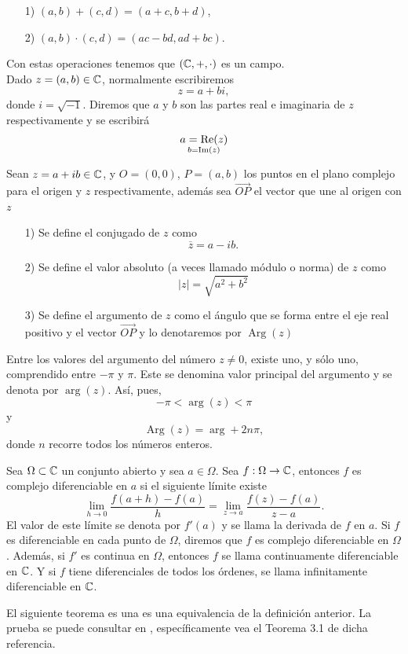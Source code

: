 \begin{itemize}
	\item [1)] $(a, b) + (c, d) = (a + c, b + d)$,
	\item [2)] $(a, b)\cdot(c, d) = (ac - bd, ad + bc).$
\end{itemize}
Con estas operaciones tenemos que $(\mathbb{C},+,\cdot)$ es un campo.\\
\noindent Dado $z=(a,b)\in \mathbb{C}$, normalmente escribiremos $$z=a+bi,$$
donde $i=\sqrt{-1}$. Diremos que $a$ y $b$ son las partes real e imaginaria de $z$ respectivamente y se escribirá
$$a=\operatorname{Re}(z)\atop b=\operatorname{Im}(z)$$
\begin{defi}
	Sean $z=a+ib\in\mathbb{C}$, y $O=(0,0)$, $P=(a,b)$ los puntos en el plano complejo para el origen y $z$ respectivamente, además sea $\vec{OP}$ el vector que une al origen con $z$
	\begin{itemize}
		\item [1)] Se define el conjugado de $z$ como $$\overline{z}=a-ib.$$
		\item [2)] Se define el valor absoluto (a veces llamado módulo o norma) de $z$ como $$|z|=\sqrt{a^2+b^2}$$
		\item [3)] Se define el argumento de $z$ como el ángulo que se forma entre el eje real positivo  y el vector $\vec{OP}$ y lo denotaremos por $\operatorname{Arg}(z)$
	\end{itemize}
\end{defi}
\noindent Entre los valores del argumento del número $z\neq 0$, existe uno, y sólo uno, comprendido entre $-\pi$ y $\pi$. Este se denomina valor principal del argumento y se denota por $\operatorname{arg}(z)$. Así, pues, $$-\pi<\operatorname{arg}(z)<\pi$$
y $$\operatorname{Arg}(z)=\operatorname{arg}+2n\pi,$$
donde $n$ recorre todos los números enteros.  
\begin{defi}
	Sea $\Omega\subset \mathbb{C}$ un conjunto abierto y sea $a \in \Omega$. Sea $f:\Omega\rightarrow\mathbb{C}$, entonces $f$ es complejo diferenciable en $a$ si el siguiente límite existe
	$$\lim_{h\rightarrow 0} \dfrac{f(a+h)-f(a)}{h}=\lim_{z\rightarrow a}\dfrac{f(z)-f(a)}{z-a}.$$
	El valor de este límite se denota por $f'(a)$ y se llama la derivada de $f$ en $a$. Si $f$ es diferenciable en cada punto de $\Omega$, diremos que $f$ es complejo diferenciable en $\Omega$. Además, si $f'$ es continua en $\Omega$, entonces $f$ se llama continuamente diferenciable en $\mathbb{C}$. Y si $f$ tiene diferenciales de todos los órdenes, se llama infinitamente diferenciable en $\mathbb{C}$.
\end{defi}
El siguiente teorema es una es una equivalencia de la definición anterior. La prueba se puede consultar en \cite{silverman}, específicamente vea el Teorema 3.1 de dicha referencia.

